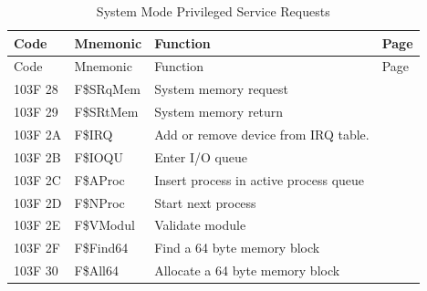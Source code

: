 \documentclass[
]{article}
\begin{document}
\begin{longtable}[]{@{}
  >{\raggedright\arraybackslash}p{}
  >{\raggedright\arraybackslash}p{}
  >{\raggedright\arraybackslash}p{}
  >{\raggedright\arraybackslash}p{}@{}}
\caption{System Mode Privileged Service Requests}\tabularnewline
\toprule\noalign{}
\begin{minipage}[b]{\linewidth}\raggedright
Code
\end{minipage} & \begin{minipage}[b]{\linewidth}\raggedright
Mnemonic
\end{minipage} & \begin{minipage}[b]{\linewidth}\raggedright
Function
\end{minipage} & \begin{minipage}[b]{\linewidth}\raggedright
Page
\end{minipage} \\
\midrule\noalign{}
\endfirsthead
\toprule\noalign{}
\begin{minipage}[b]{\linewidth}\raggedright
Code
\end{minipage} & \begin{minipage}[b]{\linewidth}\raggedright
Mnemonic
\end{minipage} & \begin{minipage}[b]{\linewidth}\raggedright
Function
\end{minipage} & \begin{minipage}[b]{\linewidth}\raggedright
Page
\end{minipage} \\
\midrule\noalign{}
\endhead
\bottomrule\noalign{}
\endlastfoot
103F 28 & F\$SRqMem & System memory request & \\
103F 29 & F\$SRtMem & System memory return & \\
103F 2A & F\$IRQ & Add or remove device from IRQ table. & \\
103F 2B & F\$IOQU & Enter I/O queue & \\
103F 2C & F\$AProc & Insert process in active process queue & \\
103F 2D & F\$NProc & Start next process & \\
103F 2E & F\$VModul & Validate module & \\
103F 2F & F\$Find64 & Find a 64 byte memory block & \\
103F 30 & F\$All64 & Allocate a 64 byte memory block & \\

\end{longtable}
\end{document}

